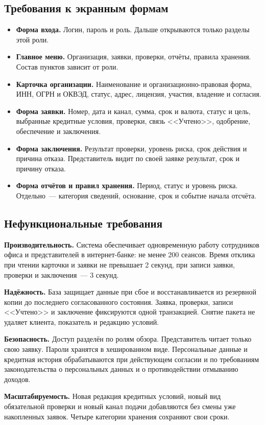 \subsection{Требования к экранным формам}

\begin{itemize}
\item \textbf{Форма входа.} Логин, пароль и роль. Дальше открываются только разделы этой роли.
\item \textbf{Главное меню.} Организация, заявки, проверки, отчёты, правила хранения. Состав пунктов зависит от роли.
\item \textbf{Карточка организации.} Наименование и организационно-правовая форма, ИНН, ОГРН и ОКВЭД, статус, адрес, лицензия, участия, владение и согласия.
\item \textbf{Форма заявки.} Номер, дата и канал, сумма, срок и валюта, статус и цель, выбранные кредитные условия, проверки, связь <<Учтено>>, одобрение, обеспечение и заключения.
\item \textbf{Форма заключения.} Результат проверки, уровень риска, срок действия и причина отказа. Представитель видит по своей заявке результат, срок и причину отказа.
\item \textbf{Форма отчётов и правил хранения.} Период, статус и уровень риска. Отдельно~--- категория сведений, основание, срок и событие начала отсчёта.
\end{itemize}

\subsection{Нефункциональные требования}

\textbf{Производительность.} Система обеспечивает одновременную работу сотрудников офиса и представителей в интернет-банке: не менее 200 сеансов. Время отклика при чтении карточки и заявки не превышает 2 секунд, при записи заявки, проверки и заключения~--- 3 секунд.

\textbf{Надёжность.} База защищает данные при сбое и восстанавливается из резервной копии до последнего согласованного состояния. Заявка, проверки, записи <<Учтено>> и заключение фиксируются одной транзакцией. Снятие пакета не удаляет клиента, показатель и редакцию условий.

\textbf{Безопасность.} Доступ разделён по ролям обзора. Представитель читает только свою заявку. Пароли хранятся в хешированном виде. Персональные данные и кредитная история обрабатываются при действующем согласии и по требованиям законодательства о персональных данных и о противодействии отмыванию доходов.

\textbf{Масштабируемость.} Новая редакция кредитных условий, новый вид обязательной проверки и новый канал подачи добавляются без смены уже накопленных заявок. Четыре категории хранения сохраняют свои сроки.
